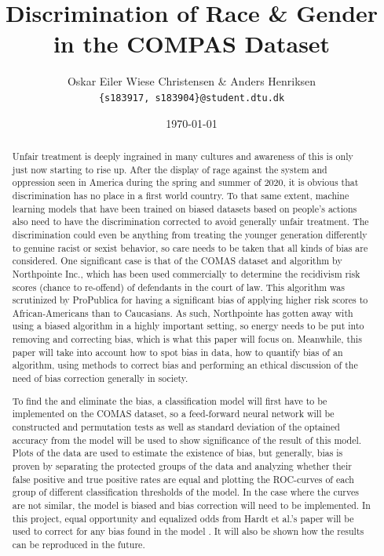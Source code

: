 \documentclass[11pt, fleqn, titlepage]{article}
\title{Discrimination of Race \& Gender in the COMPAS Dataset}
\author{Oskar Eiler Wiese Christensen \& Anders Henriksen \\ \texttt{\{s183917, s183904\}@student.dtu.dk}}
\date{\today}
\begin{document}
	
	\maketitle
	\begin{abstract}
		Unfair treatment is deeply ingrained in many cultures and awareness of this is only just now starting to rise up. After the display of rage against the system and oppression seen in America during the spring and summer of 2020, it is obvious that discrimination has no place in a first world country. To that same extent, machine learning models that have been trained on biased datasets based on people's actions also need to have the discrimination corrected to avoid generally unfair treatment. The discrimination could even be anything from treating the younger generation differently to genuine racist or sexist behavior, so care needs to be taken that all kinds of bias are considered. One significant case is that of the COMAS dataset and algorithm by Northpointe Inc., which has been used commercially to determine the recidivism risk scores (chance to re-offend) of defendants in the court of law. This algorithm was scrutinized by ProPublica for having a significant bias of applying higher risk scores to African-Americans than to Caucasians. As such, Northpointe has gotten away with using a biased algorithm in a highly important setting, so energy needs to be put into removing and correcting bias, which is what this paper will focus on. Meanwhile, this paper will take into account how to spot bias in data, how to quantify bias of an algorithm, using methods to correct bias and performing an ethical discussion of the need of bias correction generally in society.
		
		To find the and eliminate the bias, a classification model will first have to be implemented on the COMAS dataset, so a feed-forward neural network will be constructed and permutation tests as well as standard deviation of the optained accuracy from the model will be used to show significance of the result of this model. Plots of the data are used to estimate the existence of bias, but generally, bias is proven by separating the protected groups of the data and analyzing whether their false positive and true positive rates are equal and plotting the ROC-curves of each group of different classification thresholds of the model. In the case where the curves are not similar, the model is biased and bias correction will need to be implemented. In this project, equal opportunity and equalized odds from Hardt et al.'s paper will be used to correct for any bias found in the model \cite{equal_of_oppor}. It will also be shown how the results can be reproduced in the future.
		

\end{abstract}
\end{document}
